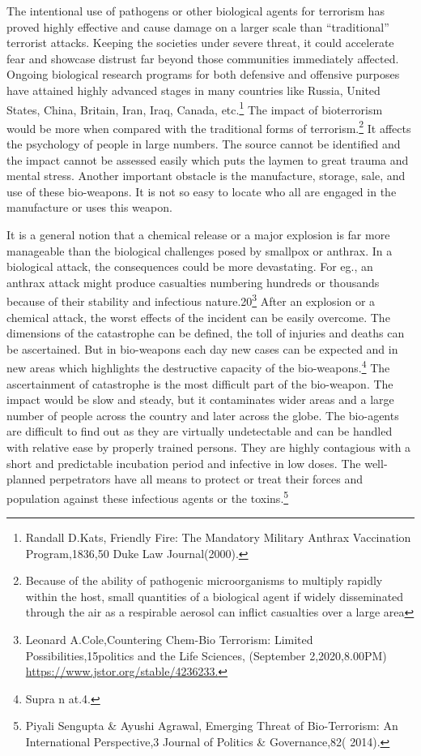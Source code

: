 \begin{multicols}{2}
\noi
The intentional use of pathogens or other biological agents for terrorism has proved highly
effective and cause damage on a larger scale than “traditional” terrorist attacks. Keeping the
societies under severe threat, it could accelerate fear and showcase distrust far beyond those
communities immediately affected. Ongoing biological research programs for both defensive
and offensive purposes have attained highly advanced stages in many countries like Russia,
United States, China, Britain, Iran, Iraq, Canada, etc.\footnote{Randall D.Kats, Friendly Fire: The Mandatory Military Anthrax Vaccination Program,1836,50 Duke Law
Journal(2000).} The impact of bioterrorism would be
more when compared with the traditional forms of terrorism.\footnote{Because of the ability of pathogenic microorganisms to multiply rapidly within the host, small quantities of a biological agent if widely disseminated through the air as a respirable aerosol can inflict casualties over a large
area}  It affects the psychology of
people in large numbers. The source cannot be identified and the impact cannot be assessed
easily which puts the laymen to great trauma and mental stress. Another important obstacle is
the manufacture, storage, sale, and use of these bio-weapons. It is not so easy to locate who
all are engaged in the manufacture or uses this weapon.

\noi
It is a general notion that a chemical release or a major explosion is far more manageable
than the biological challenges posed by smallpox or anthrax. In a biological attack, the
consequences could be more devastating. For eg., an anthrax attack might produce casualties
numbering hundreds or thousands because of their stability and infectious nature.20\footnote{Leonard A.Cole,Countering Chem-Bio Terrorism: Limited Possibilities,15politics and the Life Sciences,
(September 2,2020,8.00PM) \url{https://www.jstor.org/stable/4236233.}} After an
explosion or a chemical attack, the worst effects of the incident can be easily overcome. The
dimensions of the catastrophe can be defined, the toll of injuries and deaths can be
ascertained. But in bio-weapons each day new cases can be expected and in new areas which 
highlights the destructive capacity of the bio-weapons.\footnote{Supra n at.4.} The ascertainment of catastrophe is
the most difficult part of the bio-weapon. The impact would be slow and steady, but it
contaminates wider areas and a large number of people across the country and later across the
globe. The bio-agents are difficult to find out as they are virtually undetectable and can be
handled with relative ease by properly trained persons. They are highly contagious with a
short and predictable incubation period and infective in low doses. The well-planned
perpetrators have all means to protect or treat their forces and population against these
infectious agents or the toxins.\footnote{Piyali Sengupta \& Ayushi Agrawal, Emerging Threat of Bio-Terrorism: An International Perspective,3 Journal of Politics \& Governance,82( 2014).}


\end{multicols}
